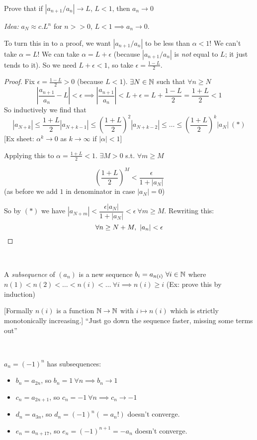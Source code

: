 \begin{example}
Prove that if $\left|a_{n+1}/a_n\right|\to L$, $L < 1$, then $a_n \to 0$	

\emph{Idea:} $a_N \approx c.L^n$ for $n >> 0$, $L<1 \implies a_n \to 0$. 

To turn this in to a proof, we want $\left|a_{n+1}/a_n\right|$ to be less than $\alpha <1$! We can't take $\alpha = L$! We can take $\alpha = L + \epsilon$ (because $\left|a_{n+1}/a_n\right|$ is \emph{not} equal to $L$; it just tends to it). So we need $L + \epsilon < 1$, so take $\epsilon = \frac{1-L}{2}$.

\begin{proof}
Fix $\epsilon = \frac{1-L}{2} > 0$ (because $L < 1$). $\exists N \in\mathbb{N}$ such that $\forall n \geq N$
\[\left|\frac{a_{n+1}}{a_n} - L\right| < \epsilon \implies \left|\frac{a_{n+1}}{a_n}\right| < L + \epsilon = L + \frac{1-L}{2} = \frac{1+L}{2} < 1\]
So inductively we find that
\[|a_{N+k}| \leq \frac{1+L}{2} |a_{N+k-1}| \leq \left(\frac{1+L}{2}\right)^2 |a_{N+k-2}| \leq \dots \leq \left(\frac{1+L}{2}\right)^k |a_{N}| ~(*)\]
[Ex sheet: $\alpha^k \to 0$ as $k \to \infty$ if $|\alpha| < 1$]

Applying this to $\alpha = \frac{1+L}{2} < 1$. $\exists M > 0$ s.t. $\forall m \geq M$

\[\left(\frac{1+L}{2}\right)^M < \frac{\epsilon}{1 + |a_N|}\]
(as before we add $1$ in denominator in case $|a_N| = 0$)

So by $(*)$ we have $|a_{N+m}| < \dfrac{\epsilon|a_N|}{1 + |a_N|} < \epsilon~\forall m \geq M$. Rewriting this: 
\[\forall n \geq N+M,~ |a_n| < \epsilon\qedhere\]
\end{proof}
\end{example}~


\begin{definition}
A \emph{subsequence} of $(a_n)$ is a new sequence $b_i = a_{n(i)}~ \forall i \in\mathbb{N}$ where $n(1) < n(2) < \dots < n(i) < \dots ~\forall i \implies n(i) \geq i$ (Ex: prove this by induction)

[Formally $n(i)$ is a function $\mathbb{N} \to \mathbb{N}$ with $i \mapsto n(i)$ which is strictly monotonically increasing.] ``Just go down the sequence faster, missing some terms out''
\end{definition}~

\begin{example}
$a_n = (-1)^n$ has subsequences:
\begin{itemize}
	\item $b_n = a_{2n}$, so $b_n = 1~\forall n \implies b_n \to 1$
	\item $c_n = a_{2n+1}$, so $c_n = -1~\forall n \implies c_n \to -1$
	\item $d_n = a_{3n}$, so $d_n = (-1)^n (=a_n!)$ doesn't converge. 
	\item $e_n = a_{n+17}$, so $e_n = (-1)^{n+1} = -a_n$ doesn't converge.
\end{itemize}

\end{example}



